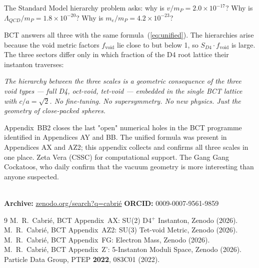 \documentclass[aps,prl,twocolumn,superscriptaddress,floatfix]{revtex4-2}
\begin{document}
The Standard Model hierarchy problem asks: why is
$v/m_P = 2.0\times10^{-17}$? Why is $\Lambda_{QCD}/m_P
= 1.8\times10^{-20}$? Why is $m_e/m_P = 4.2\times10^{-23}$?

BCT answers all three with the same formula~(\ref{eq:unified}).
The hierarchies arise because the void metric factors
$f_\text{void}$ lie close to but below 1, so
$S_{D4}\cdot f_\text{void}$ is large. The three sectors
differ only in which fraction of the D4 root lattice
their instanton traverses:

\textit{The hierarchy between the three scales is a geometric
consequence of the three void types — full D4, oct-void,
tet-void — embedded in the single BCT lattice with $c/a=\sqrt{2}$.
No fine-tuning. No supersymmetry. No new physics.
Just the geometry of close-packed spheres.}

\begin{acknowledgments}
Appendix~BB2 closes the last "open" numerical holes
in the BCT programme identified in Appendices AY and BB.
The unified formula was present in Appendices AX and AZ2;
this appendix collects and confirms all three scales in
one place. Zeta Vera (CSSC) for computational support.
The Gang Gang Cockatoos, who daily confirm that the vacuum
geometry is more interesting than anyone suspected.

\\
{\small\textbf{Archive:}
\href{https://zenodo.org/search?q=cabrie}{zenodo.org/search?q=cabri\'e}\quad
\textbf{ORCID:} 0009-0007-9561-9859}
\end{acknowledgments}

\begin{thebibliography}{9}
 M.~R.~Cabri\'{e}, BCT Appendix~AX:
SU(2) D4$^+$ Instanton, Zenodo (2026).
 M.~R.~Cabri\'{e}, BCT Appendix~AZ2:
SU(3) Tet-void Metric, Zenodo (2026).
 M.~R.~Cabri\'{e}, BCT Appendix~FG:
Electron Mass, Zenodo (2026).
 M.~R.~Cabri\'{e}, BCT Appendix~Z':
5-Instanton Moduli Space, Zenodo (2026).
 Particle Data Group,
PTEP \textbf{2022}, 083C01 (2022).
\end{thebibliography}
\end{document}

